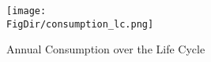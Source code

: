 \begin{figure}[ht]
  \centerline{
    \texttt{[image: \\FigDir/consumption\_lc.png]}
  }
  \caption{Annual Consumption over the Life Cycle} \label{fig:consumption_lc}
\end{figure}
